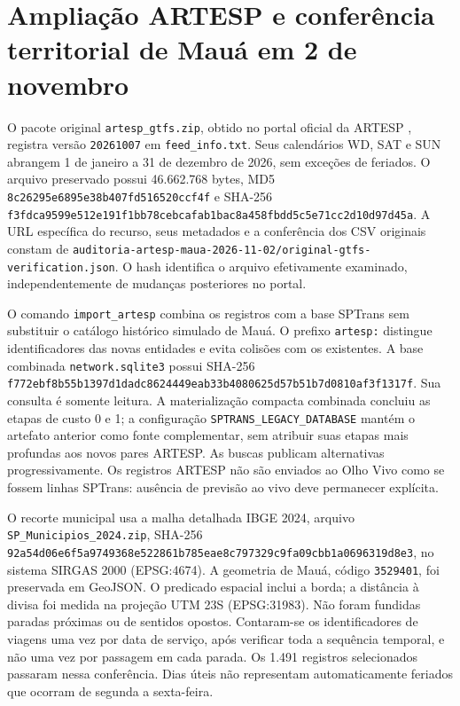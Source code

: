 \section{Ampliação ARTESP e conferência territorial de Mauá em 2 de novembro}
O pacote original \texttt{artesp\_gtfs.zip}, obtido no portal oficial da ARTESP \citep{artespgtfs2026}, registra versão \texttt{20261007} em \texttt{feed\_info.txt}. Seus calendários WD, SAT e SUN abrangem 1 de janeiro a 31 de dezembro de 2026, sem exceções de feriados. O arquivo preservado possui 46.662.768 bytes, MD5 \nolinkurl{8c26295e6895e38b407fd516520ccf4f} e SHA-256 \nolinkurl{f3fdca9599e512e191f1bb78cebcafab1bac8a458fbdd5c5e71cc2d10d97d45a}. A URL específica do recurso, seus metadados e a conferência dos CSV originais constam de \nolinkurl{auditoria-artesp-maua-2026-11-02/original-gtfs-verification.json}. O hash identifica o arquivo efetivamente examinado, independentemente de mudanças posteriores no portal.

O comando \texttt{import\_artesp} combina os registros com a base SPTrans sem substituir o catálogo histórico simulado de Mauá. O prefixo \texttt{artesp:} distingue identificadores das novas entidades e evita colisões com os existentes. A base combinada \texttt{network.sqlite3} possui SHA-256 \nolinkurl{f772ebf8b55b1397d1dadc8624449eab33b4080625d57b51b7d0810af3f1317f}. Sua consulta é somente leitura. A materialização compacta combinada concluiu as etapas de custo 0 e 1; a configuração \texttt{SPTRANS\_LEGACY\_DATABASE} mantém o artefato anterior como fonte complementar, sem atribuir suas etapas mais profundas aos novos pares ARTESP. As buscas publicam alternativas progressivamente. Os registros ARTESP não são enviados ao Olho Vivo como se fossem linhas SPTrans: ausência de previsão ao vivo deve permanecer explícita.

O recorte municipal usa a malha detalhada IBGE 2024, arquivo \texttt{SP\_Municipios\_2024.zip}, SHA-256 \nolinkurl{92a54d06e6f5a9749368e522861b785eae8c797329c9fa09cbb1a0696319d8e3}, no sistema SIRGAS 2000 (EPSG:4674). A geometria de Mauá, código \texttt{3529401}, foi preservada em GeoJSON. O predicado espacial inclui a borda; a distância à divisa foi medida na projeção UTM 23S (EPSG:31983). Não foram fundidas paradas próximas ou de sentidos opostos. Contaram-se os identificadores de viagens uma vez por data de serviço, após verificar toda a sequência temporal, e não uma vez por passagem em cada parada. Os 1.491 registros selecionados passaram nessa conferência. Dias úteis não representam automaticamente feriados que ocorram de segunda a sexta-feira.

